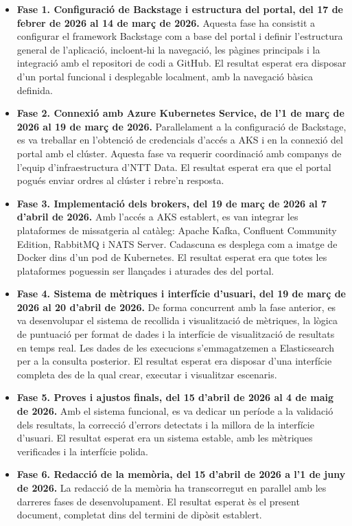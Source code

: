 \documentclass[11pt,a4paper]{article}
\begin{document}
\begin{itemize}
  \item \textbf{Fase 1. Configuraci\'o de Backstage i estructura del portal, del 17 de febrer de 2026 al 14 de mar\c{c} de 2026.} Aquesta fase ha consistit a configurar el framework Backstage com a base del portal i definir l'estructura general de l'aplicaci\'o, incloent-hi la navegaci\'o, les p\`agines principals i la integraci\'o amb el repositori de codi a GitHub. El resultat esperat era disposar d'un portal funcional i desplegable localment, amb la navegaci\'o b\`asica definida.
  \item \textbf{Fase 2. Connexi\'o amb Azure Kubernetes Service, de l'1 de mar\c{c} de 2026 al 19 de mar\c{c} de 2026.} Paral\textperiodcentered lelament a la configuraci\'o de Backstage, es va treballar en l'obtenci\'o de credencials d'acc\'es a AKS i en la connexi\'o del portal amb el cl\'uster. Aquesta fase va requerir coordinaci\'o amb companys de l'equip d'infraestructura d'NTT Data. El resultat esperat era que el portal pogu\'es enviar ordres al cl\'uster i rebre'n resposta.
  \item \textbf{Fase 3. Implementaci\'o dels brokers, del 19 de mar\c{c} de 2026 al 7 d'abril de 2026.} Amb l'acc\'es a AKS establert, es van integrar les plataformes de missatgeria al cat\`aleg: Apache Kafka, Confluent Community Edition, RabbitMQ i NATS Server. Cadascuna es desplega com a imatge de Docker dins d'un pod de Kubernetes. El resultat esperat era que totes les plataformes poguessin ser llan\c{c}ades i aturades des del portal.
  \item \textbf{Fase 4. Sistema de m\`etriques i interf\'icie d'usuari, del 19 de mar\c{c} de 2026 al 20 d'abril de 2026.} De forma concurrent amb la fase anterior, es va desenvolupar el sistema de recollida i visualitzaci\'o de m\`etriques, la l\`ogica de puntuaci\'o per format de dades i la interf\'icie de visualitzaci\'o de resultats en temps real. Les dades de les execucions s'emmagatzemen a Elasticsearch per a la consulta posterior. El resultat esperat era disposar d'una interf\'icie completa des de la qual crear, executar i visualitzar escenaris.
  \item \textbf{Fase 5. Proves i ajustos finals, del 15 d'abril de 2026 al 4 de maig de 2026.} Amb el sistema funcional, es va dedicar un per\'iode a la validaci\'o dels resultats, la correcci\'o d'errors detectats i la millora de la interf\'icie d'usuari. El resultat esperat era un sistema estable, amb les m\`etriques verificades i la interf\'icie polida.
  \item \textbf{Fase 6. Redacci\'o de la mem\`oria, del 15 d'abril de 2026 a l'1 de juny de 2026.} La redacci\'o de la mem\`oria ha transcorregut en paral\textperiodcentered lel amb les darreres fases de desenvolupament. El resultat esperat \`es el present document, completat dins del termini de dip\`osit establert.
\end{itemize}
\end{document}
